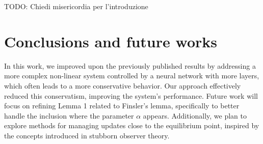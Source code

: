 \documentclass{ifacconf}
\theoremstyle{plain}
\begin{document}
{\color{red} TODO: Chiedi misericordia per l'introduzione}

\section{Conclusions and future works}
In this work, we improved upon the previously published results by addressing a more complex non-linear system controlled by a neural network with more layers, which often leads to a more conservative behavior. Our approach effectively reduced this conservatism, improving the system's performance. Future work will focus on refining Lemma 1 related to Finsler's lemma, specifically to better handle the inclusion where the parameter $\alpha$ appears. Additionally, we plan to explore methods for managing updates close to the equilibrium point, inspired by the concepts introduced in stubborn observer theory.

%

\end{document}
